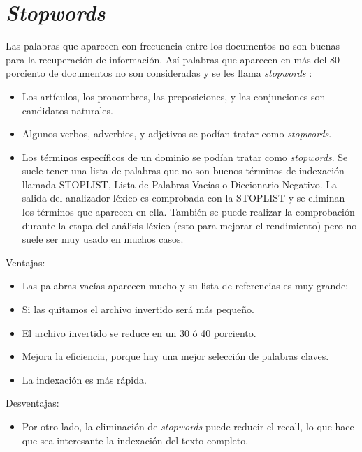 
\section{\textit{Stopwords}}
Las palabras que aparecen con frecuencia entre los documentos no son buenas para la recuperaci\'on de informaci\'on. As\'i palabras que aparecen en m\'as del 80 porciento de documentos no son consideradas y se les llama \textit{stopwords} \cite{sw} : 
 \begin{itemize}
 \item Los art\'iculos, los pronombres, las preposiciones, y las conjunciones son candidatos naturales. 
 \item Algunos verbos, adverbios, y adjetivos se pod\'ian tratar como \textit{stopwords}. 
 \item Los t\'erminos espec\'ificos de un dominio se pod\'ian tratar como \textit{stopwords}.
Se suele tener una lista de palabras que no son buenos t\'erminos de indexaci\'on llamada STOPLIST, Lista de Palabras Vac\'ias o Diccionario Negativo. La salida del analizador l\'exico es comprobada con la STOPLIST y se eliminan los t\'erminos que aparecen en ella. Tambi\'en se puede realizar la comprobaci\'on durante la etapa del an\'alisis l\'exico (esto para mejorar el rendimiento) pero no suele ser muy usado en muchos casos.
\end{itemize}

Ventajas: 
 \begin{itemize}
 \item Las palabras vac\'ias aparecen mucho y su lista de referencias es muy grande: 
 \item Si las quitamos el archivo invertido ser\'a m\'as peque\~no. 
 \item El archivo invertido se reduce en un 30 \'o 40 porciento. 
 \item Mejora la eficiencia, porque hay una mejor selecci\'on de palabras claves. 
 \item La indexaci\'on es m\'as r\'apida.
 \end{itemize}
Desventajas: 
 \begin{itemize}
 \item Por otro lado, la eliminaci\'on de \textit{stopwords} puede reducir el recall, lo que hace que sea interesante la indexaci\'on del texto completo.
 \end{itemize}